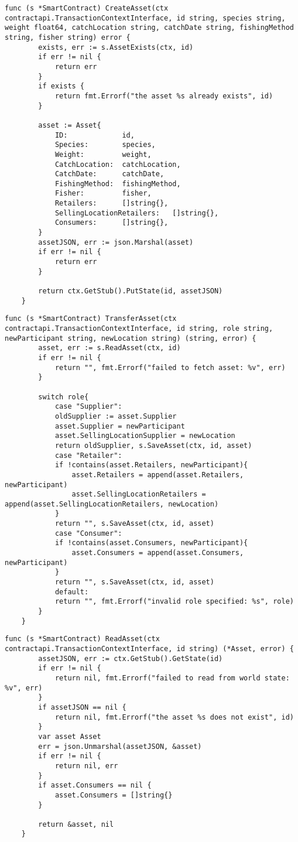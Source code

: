 \begin{lstlisting}[style=customjs, caption={CreateAsset Function}, label={lst:create-asset}]
	func (s *SmartContract) CreateAsset(ctx contractapi.TransactionContextInterface, id string, species string, weight float64, catchLocation string, catchDate string, fishingMethod string, fisher string) error {
		exists, err := s.AssetExists(ctx, id)
		if err != nil {
			return err
		}
		if exists {
			return fmt.Errorf("the asset %s already exists", id)
		}
		
		asset := Asset{
			ID:             id,
			Species:		species,
			Weight:			weight,
			CatchLocation:	catchLocation,
			CatchDate:		catchDate,
			FishingMethod:	fishingMethod,
			Fisher:			fisher,
			Retailers:		[]string{},
			SellingLocationRetailers:	[]string{},
			Consumers:      []string{},
		}
		assetJSON, err := json.Marshal(asset)
		if err != nil {
			return err
		}
		
		return ctx.GetStub().PutState(id, assetJSON)
	}
\end{lstlisting}

\begin{lstlisting}[style=customjs, caption={TransferAsset Function}, label={lst:transfer-asset}]
	func (s *SmartContract) TransferAsset(ctx contractapi.TransactionContextInterface, id string, role string, newParticipant string, newLocation string) (string, error) {
		asset, err := s.ReadAsset(ctx, id)
		if err != nil {
			return "", fmt.Errorf("failed to fetch asset: %v", err)
		}
		
		switch role{
			case "Supplier":
			oldSupplier := asset.Supplier
			asset.Supplier = newParticipant
			asset.SellingLocationSupplier = newLocation
			return oldSupplier, s.SaveAsset(ctx, id, asset)
			case "Retailer":
			if !contains(asset.Retailers, newParticipant){
				asset.Retailers = append(asset.Retailers, newParticipant)
				asset.SellingLocationRetailers = append(asset.SellingLocationRetailers, newLocation)
			}
			return "", s.SaveAsset(ctx, id, asset)
			case "Consumer":
			if !contains(asset.Consumers, newParticipant){
				asset.Consumers = append(asset.Consumers, newParticipant)
			}
			return "", s.SaveAsset(ctx, id, asset)
			default:
			return "", fmt.Errorf("invalid role specified: %s", role)
		}
	}
\end{lstlisting}

\begin{lstlisting}[style=customjs, caption={ReadAsset Function}, label={lst:read-asset}]
	func (s *SmartContract) ReadAsset(ctx contractapi.TransactionContextInterface, id string) (*Asset, error) {
		assetJSON, err := ctx.GetStub().GetState(id)
		if err != nil {
			return nil, fmt.Errorf("failed to read from world state: %v", err)
		}
		if assetJSON == nil {
			return nil, fmt.Errorf("the asset %s does not exist", id)
		}
		var asset Asset
		err = json.Unmarshal(assetJSON, &asset)
		if err != nil {
			return nil, err
		}
		if asset.Consumers == nil {
			asset.Consumers = []string{}
		}	
		
		return &asset, nil
	}
\end{lstlisting}

